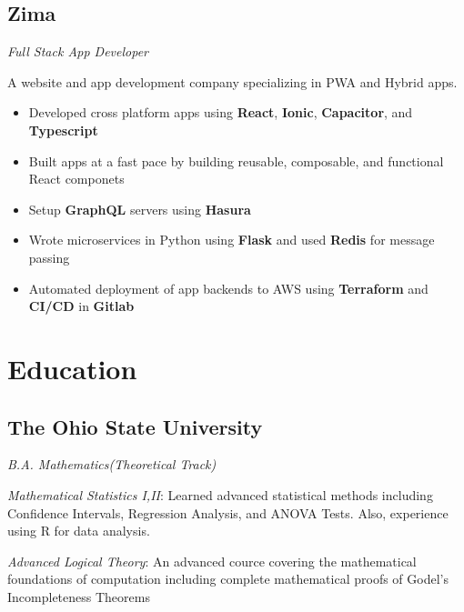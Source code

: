 \documentclass[letterpaper,11pt]{article}
\begin{document}
\subsection{Zima}
\textit{Full Stack App Developer}
\vspace{2mm}
\begin{adjustwidth}{1cm}{1cm}
A website and app development company specializing in PWA and Hybrid apps.

\begin{itemize}
\setlength\itemsep{0em}
\item Developed cross platform apps using \textbf{React}, \textbf{Ionic}, \textbf{Capacitor}, and \textbf{Typescript}
\item Built apps at a fast pace by building reusable, composable, and functional React componets
\item Setup \textbf{GraphQL} servers using \textbf{Hasura}
\item Wrote microservices in Python using \textbf{Flask} and used \textbf{Redis} for message passing
\item Automated deployment of app backends to AWS using \textbf{Terraform} and \textbf{CI/CD} in \textbf{Gitlab}
\end{itemize}

\end{adjustwidth}

\section{Education}
\subsection{The Ohio State University}
\textit{B.A. Mathematics(Theoretical Track)}
\vspace{2mm}
\begin{adjustwidth}{1cm}{1cm}
\textit{Mathematical Statistics I,II}: Learned advanced statistical methods including Confidence Intervals, Regression Analysis, and ANOVA Tests. Also, experience using R for data analysis.

\vspace{2mm}
\textit{Advanced Logical Theory}: An advanced cource covering the mathematical foundations of computation
including complete mathematical proofs of Godel's Incompleteness Theorems
\end{adjustwidth}
\end{document}
